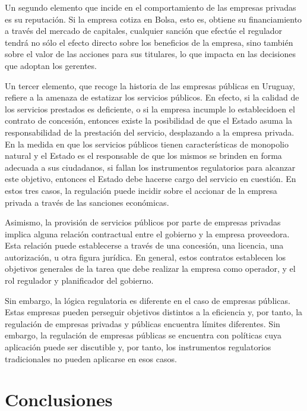\documentclass[
  12pt,
  spanish,
]{book}
\begin{document}
Un segundo elemento que incide en el comportamiento de las empresas
privadas es su reputación. Si la empresa cotiza en Bolsa, esto es,
obtiene su financiamiento a través del mercado de capitales, cualquier
sanción que efectúe el regulador tendrá no sólo el efecto directo sobre
los beneficios de la empresa, sino también sobre el valor de las
acciones para sus titulares, lo que impacta en las decisiones que
adoptan los gerentes.

Un tercer elemento, que recoge la historia de las empresas públicas en
Uruguay, refiere a la amenaza de estatizar los servicios públicos. En
efecto, si la calidad de los servicios prestados es deficiente, o si la
empresa incumple lo establecidoen el contrato de concesión, entonces
existe la posibilidad de que el Estado asuma la responsabilidad de la
prestación del servicio, desplazando a la empresa privada. En la medida
en que los servicios públicos tienen características de monopolio
natural y el Estado es el responsable de que los mismos se brinden en
forma adecuada a sus ciudadanos, si fallan los instrumentos regulatorios
para alcanzar este objetivo, entonces el Estado debe hacerse cargo del
servicio en cuestión. En estos tres casos, la regulación puede incidir
sobre el accionar de la empresa privada a través de las sanciones
económicas.

Asimismo, la provisión de servicios públicos por parte de empresas
privadas implica alguna relación contractual entre el gobierno y la
empresa proveedora. Esta relación puede establecerse a través de una
concesión, una licencia, una autorización, u otra figura jurídica. En
general, estos contratos establecen los objetivos generales de la tarea
que debe realizar la empresa como operador, y el rol regulador y
planificador del gobierno.

Sin embargo, la lógica regulatoria es diferente en el caso de empresas
públicas. Estas empresas pueden perseguir objetivos distintos a la
eficiencia y, por tanto, la regulación de empresas privadas y públicas
encuentra límites diferentes. Sin embargo, la regulación de empresas
públicas se encuentra con políticas cuya aplicación puede ser discutible
y, por tanto, los instrumentos regulatorios tradicionales no pueden
aplicarse en esos casos.

\hypertarget{conclusiones}{%
\section{Conclusiones}\label{conclusiones}}
\end{document}
